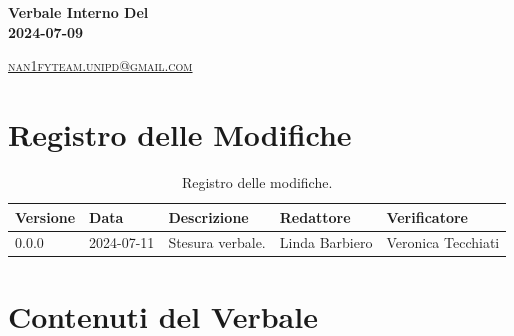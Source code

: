 \documentclass[8pt]{article}
\begin{document}
\begin{titlepage}
\begin{minipage}[t]{0.47\textwidth}
{		}
		\vspace{4mm}\vspace{4mm}
	\end{minipage}
	\vspace{4cm}
	\begin{center}
		\begin{flushright}
			{\fontsize{30pt}{52pt}\selectfont \textbf{Verbale Interno Del\\2024-07-09\\}} %
		\end{flushright}
		\vspace{3cm}
	\end{center}
	\vspace{8.5 cm}
	{\small \textsc{\href{mailto: nan1fyteam.unipd@gmail.com}{nan1fyteam.unipd@gmail.com}}}
\end{titlepage}
\pagestyle{mystyle}
\section*{Registro delle Modifiche}
\begin{table}[ht!]	
	\centering
	\begin{tabular}{p{1.2cm} p{2cm} p{5cm} p{3cm} p{3cm}}
		\toprule
		\textbf{Versione}& \textbf{Data} & \textbf{Descrizione} & \textbf{Redattore} & \textbf{Verificatore} \\
		\midrule
			0.0.0 & 2024-07-11 & Stesura verbale. & Linda Barbiero & Veronica Tecchiati
 			\\ %

		\bottomrule
	\end{tabular}
	\caption{Registro delle modifiche.}
	\label{table:Registro delle modifiche}
\end{table}
\newpage
\tableofcontents
\clearpage
\newpage
\justifying
\section{Contenuti del Verbale}
\end{document}
